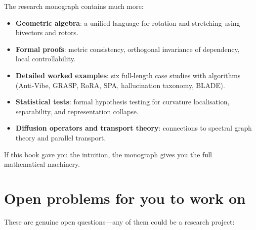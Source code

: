 \documentclass[11pt, twoside, openright]{memoir}
\begin{document}
The research monograph contains much more:

\begin{itemize}[nosep]
\item \textbf{Geometric algebra}: a unified language for rotation and
  stretching using bivectors and rotors.
\item \textbf{Formal proofs}: metric consistency, orthogonal invariance
  of dependency, local controllability.
\item \textbf{Detailed worked examples}: six full-length case studies
  with algorithms (Anti-Vibe, GRASP, RoRA, SPA, hallucination taxonomy,
  BLADE).
\item \textbf{Statistical tests}: formal hypothesis testing for
  curvature localisation, separability, and representation collapse.
\item \textbf{Diffusion operators and transport theory}: connections to
  spectral graph theory and parallel transport.
\end{itemize}

If this book gave you the intuition, the monograph gives you the full
mathematical machinery.

\section{Open problems for you to work on}

These are genuine open questions---any of them could be a research project:
\end{document}
